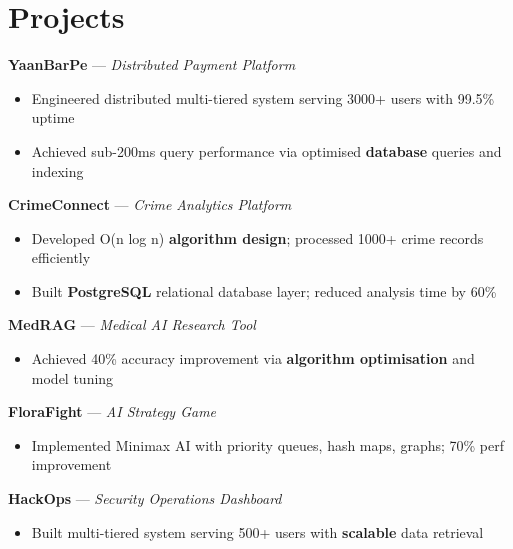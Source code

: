 \documentclass[letterpaper,10pt]{article}
\begin{document}
\section{Projects}

\textbf{YaanBarPe} — \textit{Distributed Payment Platform}
\begin{itemize}
\item Engineered distributed multi-tiered system serving 3000+ users with 99.5\% uptime
\item Achieved sub-200ms query performance via optimised \textbf{database} queries and indexing
\end{itemize}

\textbf{CrimeConnect} — \textit{Crime Analytics Platform}
\begin{itemize}
\item Developed O(n log n) \textbf{algorithm design}; processed 1000+ crime records efficiently
\item Built \textbf{PostgreSQL} relational database layer; reduced analysis time by 60\%
\end{itemize}

\textbf{MedRAG} — \textit{Medical AI Research Tool}
\begin{itemize}
\item Achieved 40\% accuracy improvement via \textbf{algorithm optimisation} and model tuning
\end{itemize}

\textbf{FloraFight} — \textit{AI Strategy Game}
\begin{itemize}
\item Implemented Minimax AI with priority queues, hash maps, graphs; 70\% perf improvement
\end{itemize}

\textbf{HackOps} — \textit{Security Operations Dashboard}
\begin{itemize}
\item Built multi-tiered system serving 500+ users with \textbf{scalable} data retrieval
\end{itemize}
\end{document}
